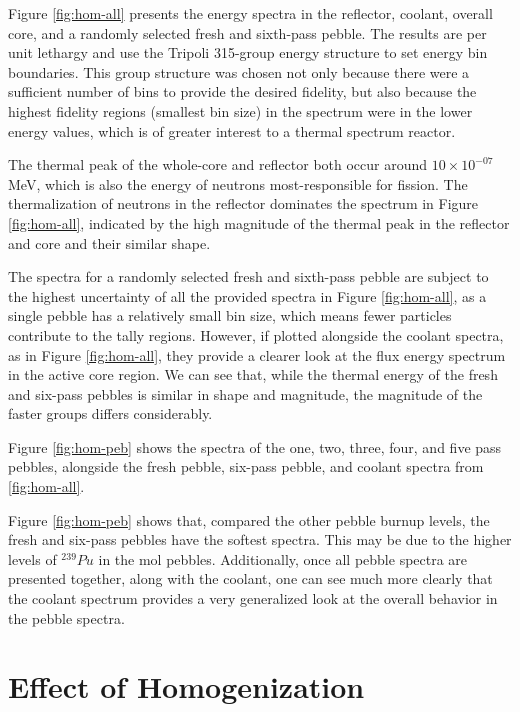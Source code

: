 Figure \ref{fig:hom-all} presents the energy spectra in the reflector, coolant, overall core, and a randomly selected fresh and sixth-pass pebble.  The results are per unit lethargy and use the Tripoli 315-group energy structure \cite{noauthor_tripoli_nodate} to set energy bin boundaries.  This group structure was chosen not only because there were a sufficient number of bins to provide the desired fidelity, but also because the highest fidelity regions (smallest bin size) in the spectrum were in the lower energy values, which is of greater interest to a thermal spectrum reactor.



The thermal peak of the whole-core and reflector both occur around $10\times10^{-07}$ MeV, which is also the energy of neutrons most-responsible for fission.  The thermalization of neutrons in the reflector dominates the spectrum in Figure \ref{fig:hom-all}, indicated by the high magnitude of the thermal peak in the reflector and core and their similar shape.

The spectra for a randomly selected fresh and sixth-pass pebble are subject to the highest uncertainty of all the provided spectra in Figure \ref{fig:hom-all}, as a single pebble has a relatively small bin size, which means fewer particles contribute to the tally regions.  However, if plotted alongside the coolant spectra, as in Figure \ref{fig:hom-all}, they provide a clearer look at the flux energy spectrum in the active core region.  We can see that, while the thermal energy of the fresh and six-pass pebbles is similar in shape and magnitude, the magnitude of the faster groups differs considerably.

Figure \ref{fig:hom-peb} shows the spectra of the one, two, three, four, and five pass pebbles, alongside the fresh pebble, six-pass pebble, and coolant spectra from \ref{fig:hom-all}. 



Figure \ref{fig:hom-peb} shows that, compared the other pebble burnup levels, the fresh and six-pass pebbles have the softest spectra.  This may be due to the higher levels of $^{239}Pu$ in the \acrshort{mol} pebbles. Additionally, once all pebble spectra are presented together, along with the coolant, one can see much more clearly that the coolant spectrum provides a very generalized look at the overall behavior in the pebble spectra.


\section{Effect of Homogenization}
\label{res-hom}

